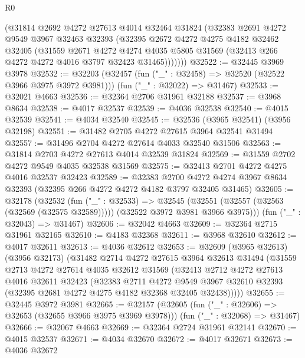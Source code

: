 \begin{lexlean}{R0}
\begin{coremodule}
        (@31814
          @2692
          @4272
          @27613
          @4014
          @32464
          @31824
          (@32383
            @2691
            @4272
            @9549
            @3967
            @32463
            @32393
            (@32395
              @2672
              @4272
              @4275
              @4182
              @32462
              @32405
              (@31559
                @2671
                @4272
                @4274
                @4035
                @5805
                @31569
                (@32413 @266 @4272 @4272 @4016 @3797 @32423 @31465)))))))
@32522 := @32445 @3969 @3978
@32532 := @32203
    (@32457 (fun ("_" : @32458) => @32520 (@32522 @3966 @3975 @3972 @3981)))
    (fun ("_" : @32022) => @31467)
@32533 := @32021 @4663
@32536 := @32364 @2706 @31961 @32188
@32537 := @3968 @8634
@32538 := @4017 @32537
@32539 := @4036 @32538
@32540 := @4015 @32539
@32541 := @4034 @32540
@32545 := @32536 (@3965 @32541) (@3956 @32198)
@32551 := @31482 @2705 @4272 @27615 @3964 @32541 @31494
@32557 := @31496 @2704 @4272 @27614 @4033 @32540 @31506
@32563 := @31814 @2703 @4272 @27613 @4014 @32539 @31824
@32569 := @31559 @2702 @4272 @9549 @4035 @32538 @31569
@32575 := @32413 @2701 @4272 @4275 @4016 @32537 @32423
@32589 := @32383
    @2700
    @4272
    @4274
    @3967
    @8634
    @32393
    (@32395 @266 @4272 @4272 @4182 @3797 @32405 @31465)
@32605 := @32178
    (@32532
      (fun ("_" : @32533) =>
      @32545 (@32551 (@32557 (@32563 (@32569 (@32575 @32589))))) (@32522 @3972 @3981 @3966 @3975)))
    (fun ("_" : @32043) => @31467)
@32606 := @32042 @4663
@32609 := @32364 @2715 @31961 @32165
@32610 := @4183 @32368
@32611 := @3968 @32610
@32612 := @4017 @32611
@32613 := @4036 @32612
@32653 := @32609
    (@3965 @32613)
    (@3956 @32173)
    (@31482
      @2714
      @4272
      @27615
      @3964
      @32613
      @31494
      (@31559
        @2713
        @4272
        @27614
        @4035
        @32612
        @31569
        (@32413
          @2712
          @4272
          @27613
          @4016
          @32611
          @32423
          (@32383
            @2711
            @4272
            @9549
            @3967
            @32610
            @32393
            (@32395 @2681 @4272 @4275 @4182 @32368 @32405 @32438)))))
@32655 := @32445 @3972 @3981
@32665 := @32157
    (@32605 (fun ("_" : @32606) => @32653 (@32655 @3966 @3975 @3969 @3978)))
    (fun ("_" : @32068) => @31467)
@32666 := @32067 @4663
@32669 := @32364 @2724 @31961 @32141
@32670 := @4015 @32537
@32671 := @4034 @32670
@32672 := @4017 @32671
@32673 := @4036 @32672

\end{coremodule}
\end{lexlean}
